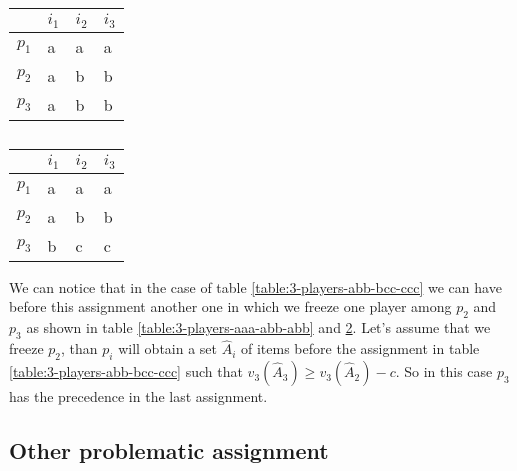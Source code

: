 \documentclass{article}
\begin{document}
\begin{table}[!htb]
    \begin{minipage}{.5\linewidth}
      \centering
        \begin{tabular}{|l|l|l|l|}
        \hline
              & $i_1$ & $i_2$ & $i_3$ \\ \hline
        $p_1$ & a     & a     & a     \\ \hline
        $p_2$ & a     & b     & b     \\ \hline
        $p_3$ & a     & b     & b     \\ \hline
        \end{tabular}
        \caption{}
        \label{table:3-players-aaa-abb-abb}
    \end{minipage}%
    \begin{minipage}{.5\linewidth}
      \centering
        \begin{tabular}{|l|l|l|l|}
        \hline
              & $i_1$ & $i_2$ & $i_3$ \\ \hline
        $p_1$ & a     & a     & a     \\ \hline
        $p_2$ & a     & b     & b     \\ \hline
        $p_3$ & b     & c     & c     \\ \hline
        \end{tabular}
        \caption{}
        \label{table:3-players-aaa-abb-bcc}
    \end{minipage}%

\end{table}

We can notice that in the case of table \ref{table:3-players-abb-bcc-ccc} we can have before this assignment another one in which we freeze one player among $p_2$ and $p_3$ as shown in table \ref{table:3-players-aaa-abb-abb} and \ref{table:3-players-aaa-abb-bcc}. Let's assume that we freeze $p_2$, than $p_i$ will obtain a set $\hat A_i$ of items before the assignment in table \ref{table:3-players-abb-bcc-ccc} such that $v_3(\hat A_3) \ge v_3(\hat A_2) - c$. So in this case $p_3$ has the precedence in the last assignment.

\subsection{Other problematic assignment}
\end{document}
